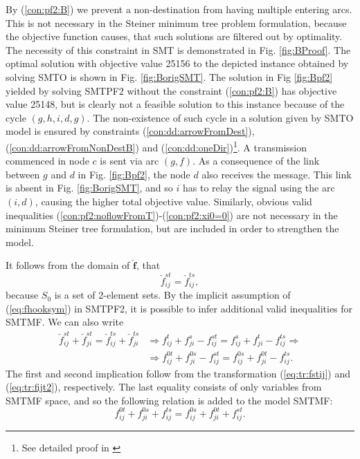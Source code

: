      By (\ref{con:pf2:B}) we prevent a non-destination from having multiple entering arcs. This is not necessary in the Steiner minimum tree problem formulation, because the objective function causes, that such solutions are filtered out by optimality. The necessity of this constraint in SMT is demonstrated in Fig. \ref{fig:BProof}. The optimal solution with objective value 25156 to the depicted instance obtained by solving SMTO is shown in Fig. \ref{fig:BorigSMT}. The solution in Fig \ref{fig:Bpf2} yielded by solving SMTPF2 without the constraint (\ref{con:pf2:B}) has objective value 25148, but is clearly not a feasible solution to this instance because of the cycle $(g,h,i,d,g)$. The non-existence of such cycle in a solution given by SMTO model is ensured by constraints (\ref{con:dd:arrowFromDest}), (\ref{con:dd:arrowFromNonDestB}) and (\ref{con:dd:oneDir})\footnote{See detailed proof in \cite{ivanova16isco}}. A transmission commenced in node $c$ is sent via arc $(g,f)$. As a consequence of the link between $g$ and $d$ in Fig. \ref{fig:Bpf2}, the node $d$ also receives the message. This link is absent in Fig. \ref{fig:BorigSMT}, and so $i$ has to relay the signal using the arc $(i,d)$, causing the higher total objective value. Similarly, obvious valid inequalities (\ref{con:pf2:noflowFromT})-(\ref{con:pf2:xi0=0}) are not necessary in the minimum Steiner tree formulation, but are included in order to strengthen the model.
   
It follows from the domain of $\mathbf{\check{f}}$, that 
\begin{equation}
\label{eq:fhooksym}
\check{f}_{ij}^{st}=\check{f}_{ij}^{ts},
\end{equation}
because $S_0$ is a set of 2-element sets. By the implicit assumption of (\ref{eq:fhooksym}) in SMTPF2, it is possible to infer additional valid inequalities for SMTMF. We can also write
\begin{align*}
\check{f}^{st}_{ij}+\check{f}^{st}_{ji}=\check{f}^{ts}_{ij}+\check{f}^{ts}_{ji} &\Rightarrow f^t_{ij}+f^s_{ji}-f^{st}_{ij}=f^s_{ij}+f^t_{ji}-f^{ts}_{ij}\Rightarrow \\ & \Rightarrow f^{0t}_{ij}+f^{0s}_{ji}-f^{st}_{ij}=f^{0s}_{ij}+f^{0t}_{ji}-f^{ts}_{ij}.
\end{align*}
The first and second implication follow from the transformation (\ref{eq:tr:fstij}) and (\ref{eq:tr:fijt2}), respectively. The last equality consists of only variables from SMTMF  space, and so the following relation is added to the model SMTMF:
\begin{equation*}f^{0t}_{ij}+f^{0s}_{ji}+f^{ts}_{ij}=f^{0s}_{ij}+f^{0t}_{ji}+f^{st}_{ij}. 
\end{equation*} 
 
